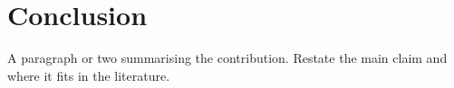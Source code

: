 \documentclass{rrxiv}
\begin{document}


\section{Conclusion}
\label{sec:conclusion}

A paragraph or two summarising the contribution. Restate the main claim
and where it fits in the literature.




\end{document}

